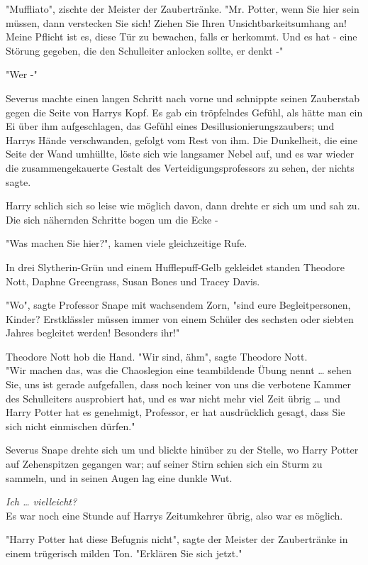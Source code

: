 {"Muffliato", zischte der Meister der Zaubertränke. "Mr. Potter, wenn Sie hier sein müssen, dann verstecken Sie sich! Ziehen Sie Ihren Unsichtbarkeitsumhang an! Meine Pflicht ist es, diese Tür zu bewachen, falls er herkommt. Und es hat - eine Störung gegeben, die den Schulleiter anlocken sollte, er denkt -"

"Wer -"

Severus machte einen langen Schritt nach vorne und schnippte seinen Zauberstab gegen die Seite von Harrys Kopf. Es gab ein tröpfelndes Gefühl, als hätte man ein Ei über ihm aufgeschlagen, das Gefühl eines Desillusionierungszaubers; und Harrys Hände verschwanden, gefolgt vom Rest von ihm. Die Dunkelheit, die eine Seite der Wand umhüllte, löste sich wie langsamer Nebel auf, und es war wieder die zusammengekauerte Gestalt des Verteidigungsprofessors zu sehen, der nichts sagte.

Harry schlich sich so leise wie möglich davon, dann drehte er sich um und sah zu. Die sich nähernden Schritte bogen um die Ecke -

"Was machen Sie hier?", kamen viele gleichzeitige Rufe.

In drei Slytherin-Grün und einem Hufflepuff-Gelb gekleidet standen Theodore Nott, Daphne Greengrass, Susan Bones und Tracey Davis.

"Wo", sagte Professor Snape mit wachsendem Zorn, "sind eure Begleitpersonen, Kinder? Erstklässler müssen immer von einem Schüler des sechsten oder siebten Jahres begleitet werden! Besonders ihr!"

Theodore Nott hob die Hand. "Wir sind, ähm", sagte Theodore Nott.\\ "Wir machen das, was die Chaoslegion eine teambildende Übung nennt … sehen Sie, uns ist gerade aufgefallen, dass noch keiner von uns die verbotene Kammer des Schulleiters ausprobiert hat, und es war nicht mehr viel Zeit übrig … und Harry Potter hat es genehmigt, Professor, er hat ausdrücklich gesagt, dass Sie sich nicht einmischen dürfen."

Severus Snape drehte sich um und blickte hinüber zu der Stelle, wo Harry Potter auf Zehenspitzen gegangen war; auf seiner Stirn schien sich ein Sturm zu sammeln, und in seinen Augen lag eine dunkle Wut.

\emph{Ich … vielleicht?}\\ Es war noch eine Stunde auf Harrys Zeitumkehrer übrig, also war es möglich.

"Harry Potter hat diese Befugnis nicht", sagte der Meister der Zaubertränke in einem trügerisch milden Ton. "Erklären Sie sich jetzt."

}

